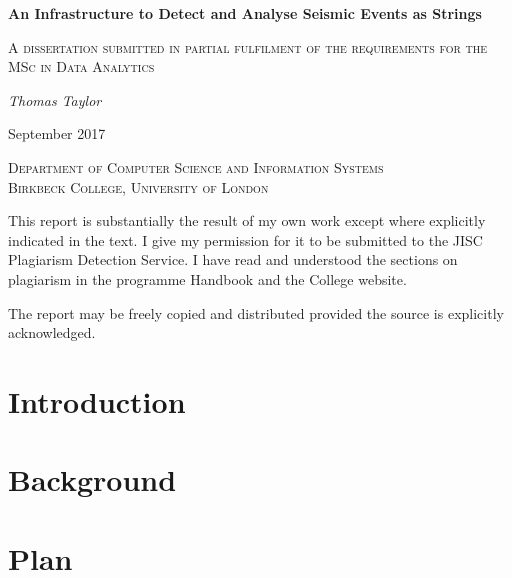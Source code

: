 \documentclass[11pt, a4paper]{scrartcl}
\begin{document}
\begin{titlepage}
	\centering
	{\huge\bfseries An Infrastructure to Detect and Analyse Seismic Events as Strings\par}
	\vspace{1cm}
	{\scshape\Large A dissertation submitted in partial fulfilment of the requirements for the MSc in Data Analytics\par}
	\vspace{1.5cm}
	{\Large\itshape Thomas Taylor\par}
	{\large September 2017\par}
	\vspace{2cm}	{\scshape\LARGE Department of Computer Science and Information Systems \\ Birkbeck College, University of London \par}

	\vfill

	\begin{itshape}
		\noindent This report is substantially the result of my own work except where explicitly indicated in the text. I give my permission for it to be submitted to the JISC Plagiarism Detection Service. I have read and understood the sections on plagiarism in the programme Handbook and the College website.
		
		\noindent The report may be freely copied and distributed provided the source is explicitly acknowledged.
	\end{itshape}
	

\end{titlepage}

\pagestyle{fancy}
\section*{Introduction}


\newpage
\tableofcontents
\newpage
{}
\listoffigures
\listoftables
\newcommand{\sectionbreak}{\clearpage}

\section{Background}






\section{Plan}

\end{document}

